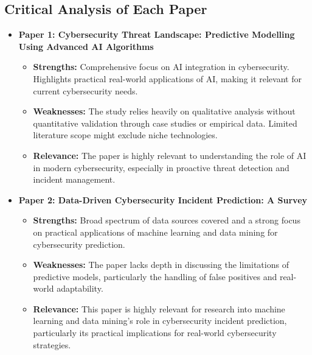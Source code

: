 \documentclass[12pt]{article}
\begin{document}
\begin{itemize}
\end{itemize}

\subsection{Critical Analysis of Each Paper}

\begin{itemize}
    \item \textbf{Paper 1: Cybersecurity Threat Landscape: Predictive Modelling Using Advanced AI Algorithms}
    \begin{itemize}
        \item \textbf{Strengths:} Comprehensive focus on AI integration in cybersecurity. Highlights practical real-world applications of AI, making it relevant for current cybersecurity needs.
        \item \textbf{Weaknesses:} The study relies heavily on qualitative analysis without quantitative validation through case studies or empirical data. Limited literature scope might exclude niche technologies.
        \item \textbf{Relevance:} The paper is highly relevant to understanding the role of AI in modern cybersecurity, especially in proactive threat detection and incident management.
    \end{itemize}

    \vspace{0.2cm}
    
    \item \textbf{Paper 2: Data-Driven Cybersecurity Incident Prediction: A Survey}
    \begin{itemize}
        \item \textbf{Strengths:} Broad spectrum of data sources covered and a strong focus on practical applications of machine learning and data mining for cybersecurity prediction.
        \item \textbf{Weaknesses:} The paper lacks depth in discussing the limitations of predictive models, particularly the handling of false positives and real-world adaptability.
        \item \textbf{Relevance:} This paper is highly relevant for research into machine learning and data mining's role in cybersecurity incident prediction, particularly its practical implications for real-world cybersecurity strategies.
    \end{itemize}
    
\end{itemize}
\end{document}
